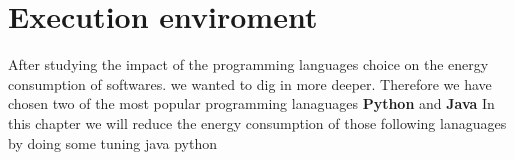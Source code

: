 \newpage

\chapter{Execution enviroment}
\label{chapter:enviroment}
After studying the impact of the programming languages choice on the energy consumption of softwares. we wanted to dig in more deeper. Therefore we have chosen two of the most popular programming lanaguages \textbf{Python} and \textbf{Java}
In this chapter we will reduce the energy consumption of those following lanaguages by doing some tuning
{java}
{python}
